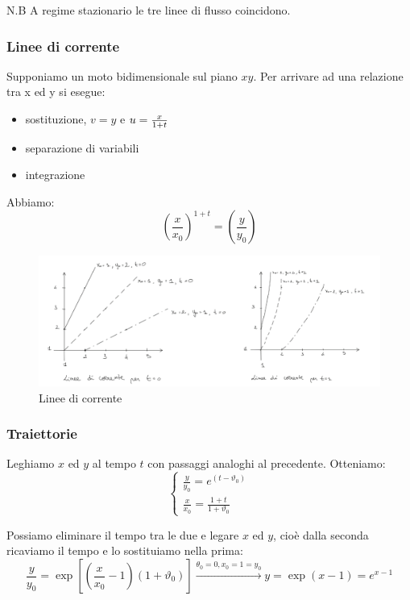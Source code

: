 \documentclass[a4paper]{article}
\numberwithin{equation}{section}%
\begin{document}
N.B A regime stazionario le tre linee di flusso coincidono.

\subsubsection{Linee di corrente}
Supponiamo un moto bidimensionale sul piano $xy$. Per arrivare ad una relazione tra x ed y si esegue:
\begin{itemize}
\item sostituzione, $v=y$ e $u={x\over 1+t}$
\item separazione di variabili
\item integrazione 
\end{itemize}

Abbiamo:
\begin{equation}
\left(\frac{x}{x_{0}}\right)^{1+t}=\left(\frac{y}{y_{0}}\right)
\end{equation}
\begin{figure}[H]
	\begin{center}
		\includegraphics[width=0.9\columnwidth]{linee_corrente.png}
	\end{center}
	\caption{Linee di corrente}
\end{figure}

\subsubsection{Traiettorie}

Leghiamo $x$ ed $y$ al tempo $t$ con passaggi analoghi al precedente. Otteniamo:
\begin{equation}
\left\{\begin{array}{l}
	\frac{y}{y_{0}}=e^{\left(t-\vartheta_{0}\right)} \\
	\frac{x}{x_{0}}=\frac{1+t}{1+\vartheta_{0}}
\end{array}\right.
\end{equation}

Possiamo eliminare il tempo tra le due e legare $x$ ed $y$, cioè dalla seconda ricaviamo il tempo e lo sostituiamo nella prima:
\begin{equation}
\frac{y}{y_{0}}=\exp \left[\left(\frac{x}{x_{0}}-1\right)\left(1+\vartheta_{0}\right)\right] \xrightarrow{\theta_0=0,x_0=1=y_0} y=\exp (x-1)=e^{x-1}
\end{equation}
\end{document}
